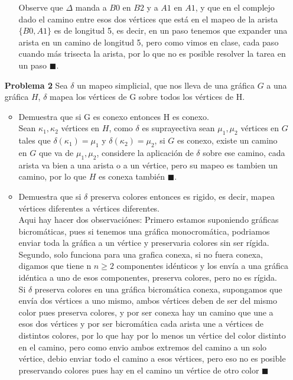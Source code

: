 \documentclass{article}
\begin{document}
\begin{enumerate}
\begin{enumerate}
  Observe que $\Delta$ manda a $B0$ en $B2$ y a $A1$ en $A1$, y que en el complejo dado el camino entre esos dos vértices que está en el mapeo de la arista $\{B0,A1\}  $ es de longitud 5, es decir, en un paso tenemos que expander una arista en un camino de longitud 5, pero como vimos en clase, cada paso cuando más trisecta la arista, por lo que no es posible resolver la tarea en un paso $\blacksquare$.

\end{enumerate}


\item[\bf{Problema 2}] Sea $\delta$ un mapeo simplicial, que nos lleva de una gráfica $G$ a una gráfica $H$, $\delta$ mapea los vértices de G sobre todos los vértices de H.

\begin{itemize}
\item Demuestra que si G es conexo entonces H es conexo.\\

Sean $\kappa_1 , \kappa_2 $ vértices en $H$, como $\delta$ es suprayectiva sean $\mu_1, \mu_2$ vértices en  $G$ tales que $\delta(\kappa_1)=\mu_1$ y $\delta(\kappa_2)=\mu_2$, si $G$ es conexo, existe un camino en $G$ que va de $\mu_1, \mu_2$, considere la aplicación de $\delta$ sobre ese camino, cada arista va bien a una arista o a un vértice, pero su mapeo es tambien un camino, por lo que $H$ es conexa también $\blacksquare$.

\item Demuestra que si $\delta$ preserva colores entonces es rigido, es decir, mapea vértices diferentes a vértices diferentes.\\

Aqui hay hacer dos observaciónes:
Primero estamos suponiendo gráficas bicromáticas, pues si tenemos una gráfica monocromática, podriamos enviar toda la gráfica a un vértice y preservaria colores sin ser rígida.
Segundo, solo funciona para una grafica conexa, si no fuera conexa, digamos que tiene n $n\ge2$ componentes idénticos y los envía a una gráfica idéntica a uno de esos componentes, preserva colores, pero no es rígida.\\

Si $\delta$ preserva colores en una gráfica bicromática conexa, supongamos que envía dos vértices a uno mismo, ambos vértices deben de ser del mismo color pues preserva colores, y por ser conexa hay un camino que une a esos dos vértices y por ser bicromática cada arista une a vértices de distintos colores, por lo que hay por lo menos un vértice del color distinto en el camino, pero como envio ambos extremos del camino a un solo vértice, debio enviar todo el camino a esos vértices, pero eso no es posible preservando colores pues hay en el camino un vértice de otro color $\blacksquare$


\end{itemize}
\end{enumerate}
\end{document}
